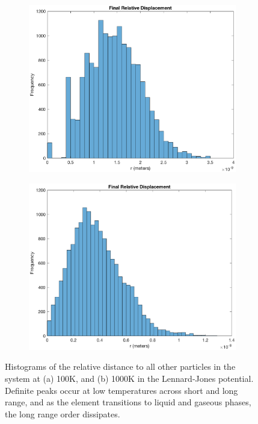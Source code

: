 \documentclass[12pt]{article}
\begin{document}
\begin{figure}[!h]
\begin{subfigure}{0.5\textwidth}
\includegraphics[width=0.9\linewidth]{./finalpics/LJfinalrelativer.eps}
\caption{\label{LJrel}}
\end{subfigure}
\begin{subfigure}{0.5\textwidth}
\includegraphics[width=0.9\linewidth]{./finalpics/LJrel1000.eps}
\caption{\label{LJrelhigh}}
\end{subfigure}
\caption{Histograms of the relative distance to all other particles in the system at (a) 100K, and (b) 1000K in the Lennard-Jones potential.  Definite peaks occur at low temperatures across short and long range, and as the element transitions to liquid and gaseous phases, the long range order dissipates.} 
\end{figure}
\end{document}

